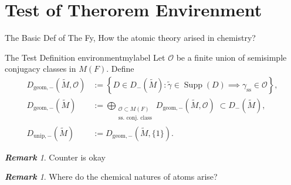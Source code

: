\documentclass[11pt, a3paper, openany]{article}
\newcommand{\Supp}{\operatorname{Supp}}
\theoremstyle{remark}
\newtheorem{remark}[]{\bfseries Remark}          %
\theoremstyle{remark}
\theoremstyle{remark}
\newenvironment{Proof of claim}
  {\begin{proof}[\normalfont \textbf{Proof of claim}]}
  {\end{proof}}
\theoremstyle{definition}
\theoremstyle{remark}
\theoremstyle{plain}
\begin{document}
\section{Test of Therorem Envirenment}
The Basic Def of The Fy, How the atomic theory arised in chemistry?
\begin{Definition}{The Test Definition environment}{mylabel}
	Let $\mathcal{O}$ be a finite union of semisimple conjugacy classes in $M(F)$. Define
	\begin{align*}
		D_{\mathrm{geom},-}(\tilde{M}, \mathcal{O}) & := \left\{ D \in D_-(\tilde{M}) : \tilde{\gamma} \in \Supp(D) \implies \gamma_{\text{ss}} \in \mathcal{O} \right\}, \\
		D_{\mathrm{geom}, -}(\tilde{M}) & := \bigoplus_{\substack{\mathcal{O} \subset M(F) \\ \text{ss.\ conj.\ class} }} D_{\mathrm{geom},-}(\tilde{M}, \mathcal{O}) \; \subset D_-(\tilde{M}), \\
		D_{\mathrm{unip}, -}(\tilde{M}) & := D_{\mathrm{geom}, -}(\tilde{M}, \{1\}).
	\end{align*}
\end{Definition}
\begin{remark}
Counter is okay
\end{remark}
\begin{remark}
    Where do the chemical natures of atoms arise?
\end{remark}
\end{document}
